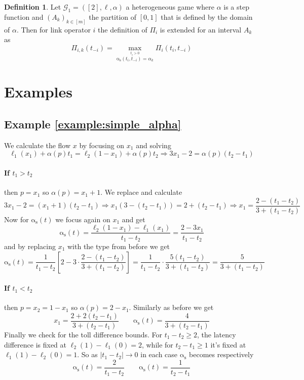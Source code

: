 \documentclass[10pt,a4paper]{book}
\newcommand{\as}{\mathrm{\alpha_s}}
\newcommand{\Gm}{\mathcal{G}}
\theoremstyle{definition}
\newtheorem{definition}{Definition}[chapter]
\theoremstyle{comment}
\begin{document}
\begin{definition}
	Let $\Gm_1 = ([2], \ell, \alpha)$ a heterogeneous game where $\alpha$ is a step function and $(A_k)_{k \in [m]}$ the partition of $[0, 1]$ that is defined by the domain of $\alpha$.
	Then for link operator $i$ the definition of $\Pi_i$ is extended for an interval $A_k$ as
	\[
	\Pi_{i, k}(t_{-i}) = \max_{\stackrel{t_i > 0}{\as(t_i, t_{-i}) = \alpha_k}}\Pi_i(t_i, t_{-i})
	\]
\end{definition}

\section*{Examples}

\subsection*{Example \ref{example:simple_alpha}}

We calculate the flow $x$ by focusing on $x_1$ and solving
\[
	\ell_1(x_1) + \alpha(p)t_1 = \ell_2(1 - x_1) + \alpha(p) t_2 \Rightarrow 3 x_1 - 2 = \alpha(p) (t_2 - t_1)
\]

\paragraph{If $t_1 > t_2$} then $p = x_1$ so $\alpha(p) = x_1 + 1$.
We replace and calculate
\[
	3 x_1 - 2 = (x_1 + 1) (t_2 - t_1) \Rightarrow x_1 (3 - (t_2 - t_1)) = 2 + (t_2 - t_1) \Rightarrow x_1 = \frac{2 - (t_1 - t_2)}{3 + (t_1 - t_2)}
\]
Now for $\as(t)$ we focus again on $x_1$ and get
\[
	\as(t) = \frac{\ell_2(1 - x_1) - \ell_1(x_1)}{t_1 - t_2} = \frac{2 - 3 x_1}{t_1 - t_2}
\]
and by replacing $x_1$ with the type from before we get
\[
	\as(t) = \frac{1}{t_1 - t_2} \left[2 - 3 \cdot \frac{2 - (t_1 - t_2)}{3 + (t_1 - t_2)}\right] = \frac{1}{t_1 - t_2} \cdot \frac{5(t_1 - t_2)}{3 + (t_1 - t_2)} = \frac{5}{3 + (t_1 - t_2)}
\]

\paragraph{If $t_1 < t_2$} then $p = x_2 = 1 - x_1$ so $\alpha(p) = 2 - x_1$.
Similarly as before we get
\[
	x_1 = \frac{2 + 2(t_2 - t_1)}{3 + (t_2 - t_1)} \qquad \as(t) = \frac{4}{3 + (t_2 - t_1)}
\]
Finally we check for the toll difference bounds.
For $t_1 - t_2 \ge 2$, the latency difference is fixed at $\ell_2(1) - \ell_1(0) = 2$, while for $t_2 - t_1 \ge 1$ it's fixed at $\ell_1(1) - \ell_2(0) = 1$.
So as $|t_1 - t_2| \rightarrow 0$ in each case $\as$ becomes respectively
\[
	\as(t) = \frac{2}{t_1 - t_2} \qquad \as(t) = \frac{1}{t_2 - t_1}
\]
\end{document}
